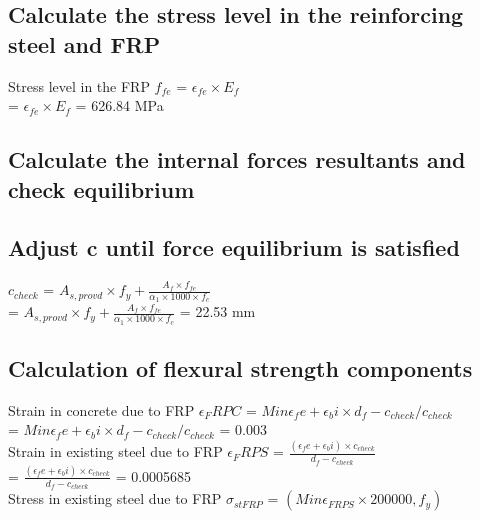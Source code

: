 \documentclass[12pt,a4paper]{article} %
\newcommand{\tab}{\hspace*{2em}} %
\begin{document}
\subsection{Calculate the stress level in the reinforcing steel and FRP} 

\tab Stress level in the FRP $f_{fe}$ = $ \epsilon_{fe} \times E_f $ \\[8pt]

\tab\tab\tab\tab\tab = $ \epsilon_{fe} \times E_f $  = 626.84 MPa \\[8pt]


\subsection{Calculate the internal forces resultants and check equilibrium} 


\subsection{Adjust c until force equilibrium is satisfied} 

\tab $c_{check}$ = $A_{s,provd} \times f_y + \frac{A_f \times f_{fe}}{\alpha_1 \times 1000 \times f_c}$ \\[8pt]

\tab\tab\tab\tab\tab = $A_{s,provd} \times f_y + \frac{A_f \times f_{fe}}{\alpha_1 \times 1000 \times f_c}$ = 22.53 mm \\[8pt]

\subsection{Calculation of flexural strength components} 

\tab Strain in concrete due to FRP $\epsilon_FRPC$ = $Min{{\epsilon_fe + \epsilon_bi} \times {d_f-c_{check}}/c_{check}}$ \\[8pt]

\tab\tab\tab\tab\tab = $Min{{\epsilon_fe + \epsilon_bi} \times {d_f-c_{check}}/c_{check}}$ = 0.003 \\[8pt]

\tab Strain in existing steel due to FRP $\epsilon_FRPS$ = $\frac{(\epsilon_fe + \epsilon_bi) \times c_{check}}{d_f- c_{check}}$ \\[8pt]

\tab\tab\tab\tab\tab = $\frac{(\epsilon_fe + \epsilon_bi) \times c_{check}}{d_f- c_{check}}$ = 0.0005685 \\[8pt]

\tab Stress in existing steel due to FRP $\sigma_{stFRP}$ =
$(Min{{\epsilon_{FRPS} \times 200000}, {f_y}})$ \\[8pt]
\end{document}

